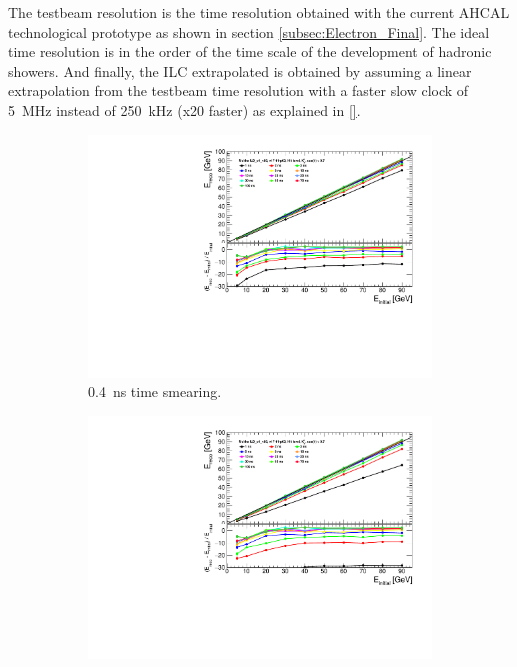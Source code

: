 The testbeam resolution is the time resolution obtained with the current AHCAL technological prototype as shown in section \ref{subsec:Electron_Final}. The ideal time resolution is in the order of the time scale of the development of hadronic showers. And finally, the ILC extrapolated is obtained by assuming a linear extrapolation from the testbeam time resolution with a faster slow clock of \SI{5}{\mega\hertz} instead of \SI{250}{\kilo\hertz} (x20 faster) as explained in \ref{}.\\

\begin{figure}[htbp!]
  \centering
  \begin{subfigure}[t]{0.48\textwidth}
    \centering
    \includegraphics[width=1\linewidth]{../Thesis_Plots/ILD/Smearing_0.4ns/Plots/Linearity_TimeCuts_Smearing1}
    \caption{\SI{0.4}{\nano\second} time smearing.} \label{fig:Lin0.4ns}
  \end{subfigure}
  \begin{subfigure}[t]{0.48\textwidth}
    \centering
    \includegraphics[width=1\linewidth]{../Thesis_Plots/ILD/Smearing_1ns/Plots/Linearity_TimeCuts_Smearing2}

\end{subfigure}
\end{figure}
